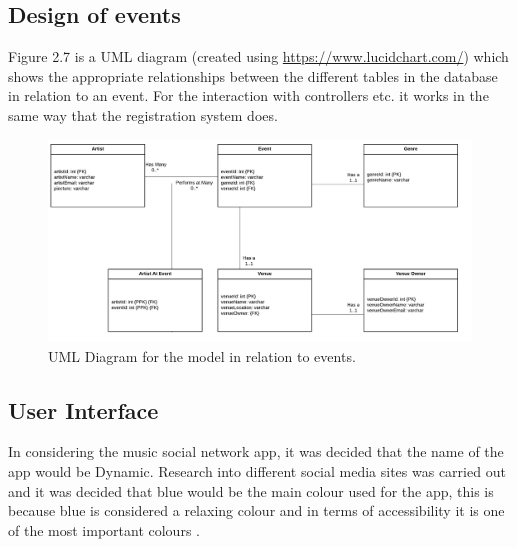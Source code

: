 \subsection{Design of events}

Figure 2.7 is a UML diagram (created using \url{https://www.lucidchart.com/}) which shows the appropriate relationships between the different tables in the database in relation to an event. For the interaction with controllers etc. it works in the same way that the registration system does.
\begin{figure}[H]
\includegraphics[width=\textwidth,height=\textheight,keepaspectratio]{images/events}
\caption{UML Diagram for the model in relation to events.}
\end{figure}


\subsection{User Interface}
In considering the music social network app, it was decided that the name of the app would be Dynamic. Research into different social media sites was carried out and it was decided that blue would be the main colour used for the app, this is because blue is considered a relaxing colour and in terms of accessibility it is one of the most important colours \cite{col}.
